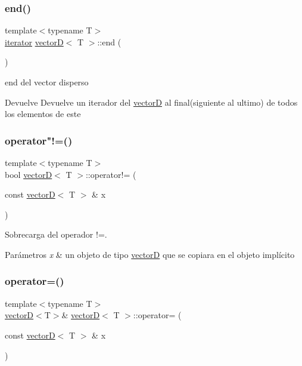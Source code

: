 \subsubsection{\texorpdfstring{end()}{end()}}
{\footnotesize\ttfamily template$<$typename T$>$ \\
\hyperlink{classvectorD_1_1iterator}{iterator} \hyperlink{classvectorD}{vectorD}$<$ T $>$\+::end (\begin{DoxyParamCaption}{ }\end{DoxyParamCaption})}



end del vector disperso 

\begin{DoxyReturn}{Devuelve}
Devuelve un iterador del \hyperlink{classvectorD}{vectorD} al final(siguiente al ultimo) de todos los elementos de este 
\end{DoxyReturn}
\mbox{\label{classvectorD_af5d305276111068683ba3b2ebb27fc49}} 
\subsubsection{\texorpdfstring{operator"!=()}{operator!=()}}
{\footnotesize\ttfamily template$<$typename T$>$ \\
bool \hyperlink{classvectorD}{vectorD}$<$ T $>$\+::operator!= (\begin{DoxyParamCaption}\item[{const \hyperlink{classvectorD}{vectorD}$<$ T $>$ \&}]{x }\end{DoxyParamCaption})}



Sobrecarga del operador !=. 


\begin{DoxyParams}{Parámetros}
{\em x} & un objeto de tipo \hyperlink{classvectorD}{vectorD} que se copiara en el objeto implícito \\
\hline
\end{DoxyParams}
\mbox{\label{classvectorD_a16d2e67eccae9d0a4fe5aac2628fe0ca}} 
\subsubsection{\texorpdfstring{operator=()}{operator=()}}
{\footnotesize\ttfamily template$<$typename T$>$ \\
\hyperlink{classvectorD}{vectorD}$<$T$>$\& \hyperlink{classvectorD}{vectorD}$<$ T $>$\+::operator= (\begin{DoxyParamCaption}\item[{const \hyperlink{classvectorD}{vectorD}$<$ T $>$ \&}]{x }\end{DoxyParamCaption})}



